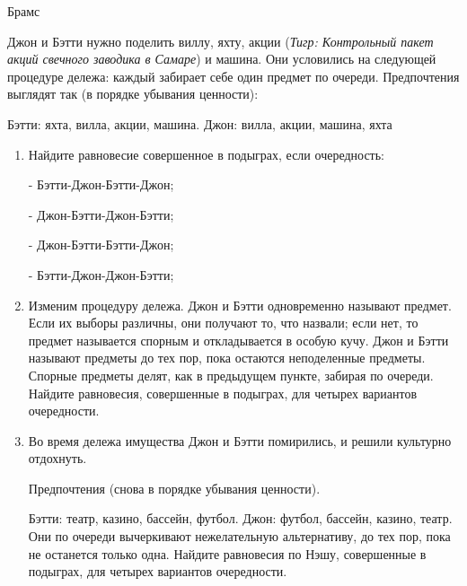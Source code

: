\begin{problem}[Развод]\par
\begin{source}
Брамс
\end{source}
Джон и Бэтти нужно поделить виллу, яхту, акции ({\it Тигр: Контрольный пакет акций свечного заводика в Самаре}) и машина. Они условились на следующей процедуре дележа: каждый забирает себе один предмет по очереди.
Предпочтения выглядят так (в порядке убывания ценности):\par
Бэтти: яхта, вилла, акции, машина. Джон: вилла, акции, машина, яхта
\begin{enumerate}
\item     Найдите равновесие совершенное в подыграх, если очередность:\par
- Бэтти-Джон-Бэтти-Джон;\par
- Джон-Бэтти-Джон-Бэтти;\par
- Джон-Бэтти-Бэтти-Джон;\par
- Бэтти-Джон-Джон-Бэтти;\par
\item Изменим процедуру дележа. Джон и Бэтти одновременно называют предмет. Если их выборы различны, они получают то, что назвали; если нет, то предмет называется спорным и откладывается в особую кучу. Джон и Бэтти называют предметы до тех пор, пока остаются неподеленные предметы. Спорные предметы делят, как в предыдущем пункте, забирая по очереди. Найдите равновесия, совершенные в подыграх, для четырех вариантов очередности.\par
\item Во время дележа имущества Джон и Бэтти помирились, и решили культурно отдохнуть.\par
Предпочтения (снова в порядке убывания ценности).\par
Бэтти: театр, казино, бассейн, футбол. Джон: футбол, бассейн, казино, театр.
Они по очереди вычеркивают нежелательную альтернативу, до тех пор, пока не останется только одна. Найдите равновесия по Нэшу, совершенные в подыграх, для четырех вариантов очередности.
\end{enumerate}
\par



\begin{sol}

\end{sol}
\end{problem}



